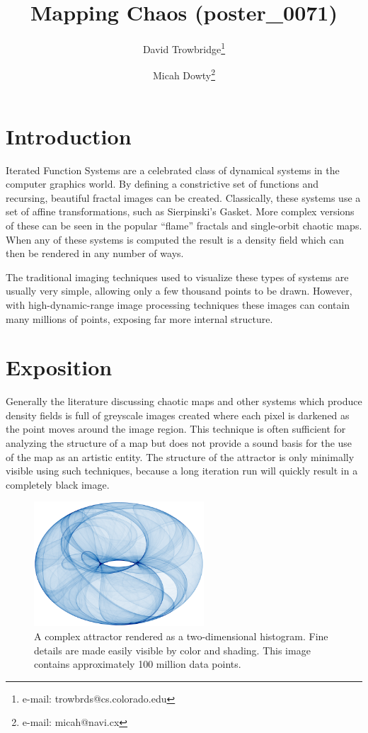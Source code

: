 \documentclass{acmsiggraph}
\title{Mapping Chaos (poster\_0071)}
\author{
  David Trowbridge\thanks{e-mail: trowbrds@cs.colorado.edu}
\and
  Micah Dowty\thanks{e-mail: micah@navi.cx}
}
\begin{document}
\maketitle

\section{Introduction}
\copyrightspace
Iterated Function Systems are a celebrated class of dynamical systems in the
computer graphics world. By defining a constrictive set of functions and
recursing, beautiful fractal images can be created. Classically, these
systems use a set of affine transformations, such as Sierpinski's Gasket.
More complex versions of these can be seen in the popular ``flame'' fractals
and single-orbit chaotic maps. When any of these systems is computed the
result is a density field which can then be rendered in any number of ways.

The traditional imaging techniques used to visualize these types of systems
are usually very simple, allowing only a few thousand points to be drawn.
However, with high-dynamic-range image processing techniques these images
can contain many millions of points, exposing far more internal structure.

\section{Exposition}
Generally the literature discussing chaotic maps and other systems which
produce density fields is full of greyscale images created where each pixel
is darkened as the point moves around the image region. This technique is
often sufficient for analyzing the structure of a map but does not provide
a sound basis for the use of the map as an artistic entity. The structure
of the attractor is only minimally visible using such techniques, because
a long iteration run will quickly result in a completely black image.

\begin{figure}[ht]
\centering
\includegraphics[width=2.5in]{1.png}
\caption{A complex attractor rendered as a two-dimensional histogram.
Fine details are made easily visible by color and shading. This image
contains approximately 100 million data points.}
\end{figure}
\end{document}
